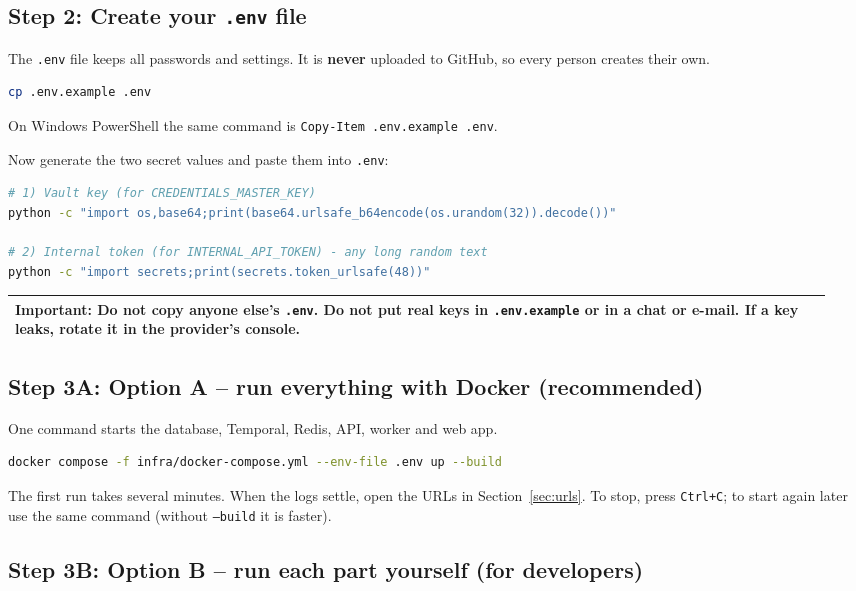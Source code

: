 \documentclass[11pt,a4paper]{article}
\newenvironment{important}
  {\par\smallskip\noindent\begin{tabular}{|p{0.95\linewidth}|}\hline\rowcolor{noteg}\vspace{2pt}\textbf{Important: }}
  {\vspace{2pt}\\\hline\end{tabular}\par\smallskip}
\begin{document}
\subsection{Step 2: Create your \texttt{.env} file}

The \texttt{.env} file keeps all passwords and settings. It is \textbf{never} uploaded to
GitHub, so every person creates their own.

\begin{lstlisting}[language=bash]
cp .env.example .env
\end{lstlisting}

On Windows PowerShell the same command is \texttt{Copy-Item .env.example .env}.

Now generate the two secret values and paste them into \texttt{.env}:

\begin{lstlisting}[language=bash]
# 1) Vault key (for CREDENTIALS_MASTER_KEY)
python -c "import os,base64;print(base64.urlsafe_b64encode(os.urandom(32)).decode())"

# 2) Internal token (for INTERNAL_API_TOKEN) - any long random text
python -c "import secrets;print(secrets.token_urlsafe(48))"
\end{lstlisting}

\begin{important}
Do not copy anyone else's \texttt{.env}. Do not put real keys in \texttt{.env.example}
or in a chat or e-mail. If a key leaks, rotate it in the provider's console.
\end{important}

\subsection{Step 3A: Option A -- run everything with Docker (recommended)}

One command starts the database, Temporal, Redis, API, worker and web app.

\begin{lstlisting}[language=bash]
docker compose -f infra/docker-compose.yml --env-file .env up --build
\end{lstlisting}

The first run takes several minutes. When the logs settle, open the URLs in
Section~\ref{sec:urls}. To stop, press \texttt{Ctrl+C}; to start again later use the same
command (without \texttt{--build} it is faster).

\subsection{Step 3B: Option B -- run each part yourself (for developers)}
\end{document}
